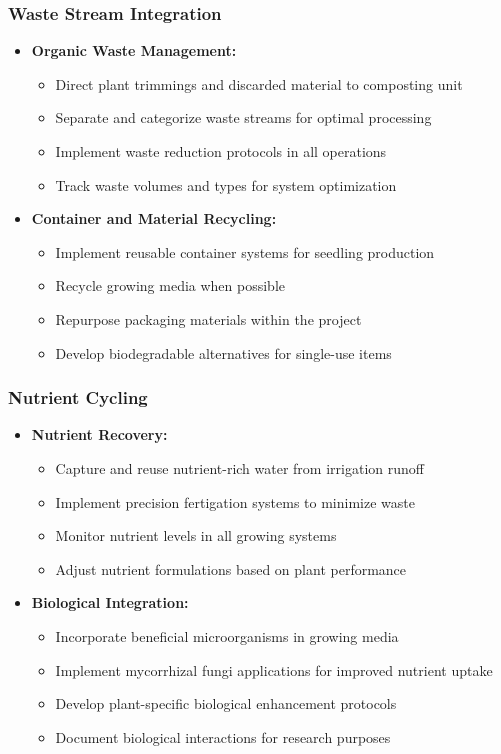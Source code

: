 \subsubsection{Waste Stream Integration}
\begin{itemize}
    \item \textbf{Organic Waste Management:}
    \begin{itemize}
        \item Direct plant trimmings and discarded material to composting unit
        \item Separate and categorize waste streams for optimal processing
        \item Implement waste reduction protocols in all operations
        \item Track waste volumes and types for system optimization
    \end{itemize}
    
    \item \textbf{Container and Material Recycling:}
    \begin{itemize}
        \item Implement reusable container systems for seedling production
        \item Recycle growing media when possible
        \item Repurpose packaging materials within the project
        \item Develop biodegradable alternatives for single-use items
    \end{itemize}
\end{itemize}

\subsubsection{Nutrient Cycling}
\begin{itemize}
    \item \textbf{Nutrient Recovery:}
    \begin{itemize}
        \item Capture and reuse nutrient-rich water from irrigation runoff
        \item Implement precision fertigation systems to minimize waste
        \item Monitor nutrient levels in all growing systems
        \item Adjust nutrient formulations based on plant performance
    \end{itemize}
    
    \item \textbf{Biological Integration:}
    \begin{itemize}
        \item Incorporate beneficial microorganisms in growing media
        \item Implement mycorrhizal fungi applications for improved nutrient uptake
        \item Develop plant-specific biological enhancement protocols
        \item Document biological interactions for research purposes
    \end{itemize}
\end{itemize}

